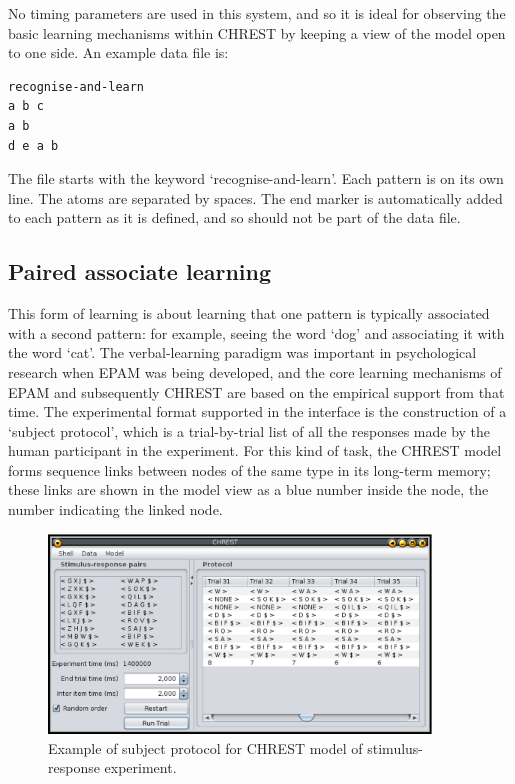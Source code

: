 \documentclass{article}
\begin{document}
No timing parameters are used in this system, and so it is ideal for observing
the basic learning mechanisms within CHREST by keeping a view of the model open
to one side.  An example data file is: 

\begin{verbatim}
recognise-and-learn 
a b c 
a b 
d e a b
\end{verbatim}

The file starts with the keyword `recognise-and-learn'.  Each pattern is on its
own line.  The atoms are separated by spaces.  The end marker is automatically
added to each pattern as it is defined, and so should not be part of the data
file.

\subsection{Paired associate learning}

This form of learning is about learning that one pattern is typically
associated with a second pattern: for example, seeing the word `dog' and
associating it with the word `cat'.  The verbal-learning paradigm was important
in psychological research when EPAM was being developed, and the core learning
mechanisms of EPAM and subsequently CHREST are based on the empirical support
from that time.  The experimental format supported in the interface is the
construction of a `subject protocol', which is a trial-by-trial list of all the
responses made by the human participant in the experiment.  For this kind of
task, the CHREST model forms sequence links between nodes of the same type in
its long-term memory; these links are shown in the model view as a blue number
inside the node, the number indicating the linked node.

\begin{figure}
\includegraphics[width=4.0in]{images/paired-associate.eps}
\caption{Example of subject protocol for CHREST model of stimulus-response
experiment.}
\label{paired-associate}
\end{figure}
\end{document}
